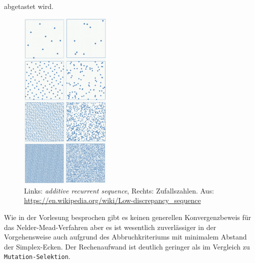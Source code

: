 \documentclass[a4paper, 12pt]{report}
\begin{document}
abgetastet wird.
\begin{figure}[H]
  \centering
  \includegraphics[height=8.75cm]{Subrandom_2D.png}
  \caption{Links: \textit{additive recurrent sequence}, Rechts: Zufallszahlen. Aus: \protect\url{https://en.wikipedia.org/wiki/Low-discrepancy_sequence}}
\end{figure}
Wie in der Vorlesung besprochen gibt es keinen generellen Konvergenzbeweis für das Nelder-Mead-Verfahren aber es ist wesentlich zuverlässiger
in der Vorgehensweise auch aufgrund des Abbruchkriteriums mit minimalem Abstand der Simplex-Ecken. Der Rechenaufwand ist deutlich geringer als
im Vergleich zu \lstinline[basicstyle=\ttfamily\color{black}]|Mutation-Selektion|.
\end{document}
